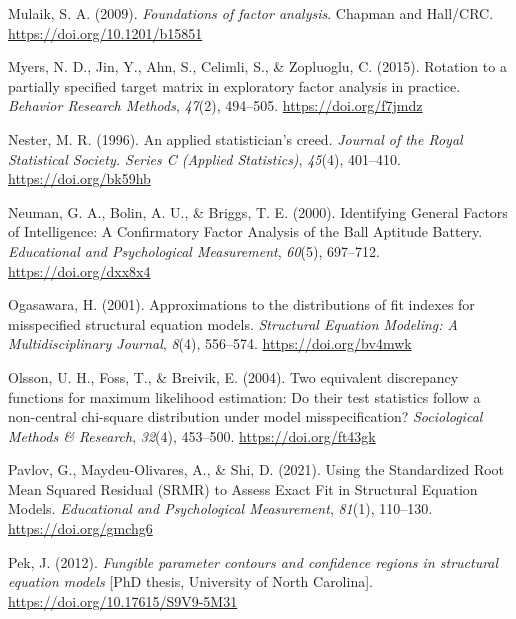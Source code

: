 \documentclass[11pt]{umnthesis}
\newlength{\cslhangindent}
\newenvironment{CSLReferences}[2] %
 {%
  \setlength{\parindent}{0pt}
  \ifodd #1 \everypar{\setlength{\hangindent}{\cslhangindent}}\ignorespaces\fi
  \ifnum #2 > 0
  \setlength{\parskip}{#2\baselineskip}
  \fi
 }%
 {}
\begin{document}
\begin{CSLReferences}{1}{0}
\leavevmode{}%
Mulaik, S. A. (2009). \emph{Foundations of factor analysis}. {Chapman and Hall/CRC}. \url{https://doi.org/10.1201/b15851}

\leavevmode{}%
Myers, N. D., Jin, Y., Ahn, S., Celimli, S., \& Zopluoglu, C. (2015). Rotation to a partially specified target matrix in exploratory factor analysis in practice. \emph{Behavior Research Methods}, \emph{47}(2), 494--505. \url{https://doi.org/f7jmdz}

\leavevmode{}%
Nester, M. R. (1996). An applied statistician's creed. \emph{Journal of the Royal Statistical Society. Series C (Applied Statistics)}, \emph{45}(4), 401--410. \url{https://doi.org/bk59hb}

\leavevmode{}%
Neuman, G. A., Bolin, A. U., \& Briggs, T. E. (2000). Identifying {General Factors} of {Intelligence}: {A Confirmatory Factor Analysis} of the {Ball Aptitude Battery}. \emph{Educational and Psychological Measurement}, \emph{60}(5), 697--712. \url{https://doi.org/dxx8x4}

\leavevmode{}%
Ogasawara, H. (2001). Approximations to the distributions of fit indexes for misspecified structural equation models. \emph{Structural Equation Modeling: A Multidisciplinary Journal}, \emph{8}(4), 556--574. \url{https://doi.org/bv4mwk}

\leavevmode{}%
Olsson, U. H., Foss, T., \& Breivik, E. (2004). Two equivalent discrepancy functions for maximum likelihood estimation: {Do} their test statistics follow a non-central chi-square distribution under model misspecification? \emph{Sociological Methods \& Research}, \emph{32}(4), 453--500. \url{https://doi.org/ft43gk}

\leavevmode{}%
Pavlov, G., Maydeu-Olivares, A., \& Shi, D. (2021). Using the {Standardized Root Mean Squared Residual} ({SRMR}) to {Assess Exact Fit} in {Structural Equation Models}. \emph{Educational and Psychological Measurement}, \emph{81}(1), 110--130. \url{https://doi.org/gmchg6}

\leavevmode{}%
Pek, J. (2012). \emph{Fungible parameter contours and confidence regions in structural equation models} {[}PhD thesis, University of North Carolina{]}. \url{https://doi.org/10.17615/S9V9-5M31}


\end{CSLReferences}
\end{document}

